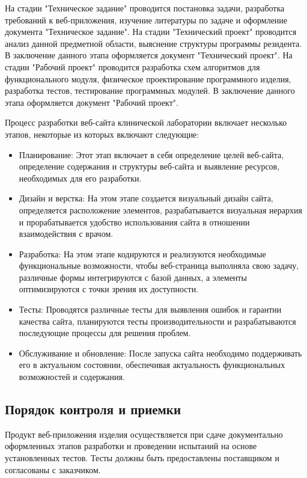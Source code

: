 На стадии "Техническое задание" проводится постановка задачи, разработка требований к веб-приложения, изучение литературы по задаче и оформление документа "Техническое задание".
На стадии "Технический проект" проводится анализ данной предметной области, выяснение структуры программы резидента. В заключение данного этапа оформляется документ "Технический проект".
На стадии "Рабочий проект" проводится разработка схем алгоритмов для функционального модуля, физическое проектирование программного изделия, разработка тестов, тестирование программных модулей. В заключение данного этапа оформляется документ "Рабочий проект".

Процесс разработки веб-сайта клинической лаборатории включает несколько этапов, некоторые из которых включают следующие:

\begin{itemize}
	\item Планирование: Этот этап включает в себя определение целей веб-сайта, определение содержания и структуры веб-сайта и выявление ресурсов, необходимых для его разработки.
	\item Дизайн и верстка: На этом этапе создается визуальный дизайн сайта, определяется расположение элементов, разрабатывается визуальная иерархия и прорабатывается удобство использования сайта в отношении взаимодействия с врачом.
	\item Разработка: На этом этапе кодируются и реализуются необходимые функциональные возможности, чтобы веб-страница выполняла свою задачу, различные формы интегрируются с базой данных, а элементы оптимизируются с точки зрения их доступности.
	\item Тесты: Проводятся различные тесты для выявления ошибок и гарантии качества сайта, планируются тесты производительности и разрабатываются последующие процессы для решения проблем.
	\item Обслуживание и обновление: После запуска сайта необходимо поддерживать его в актуальном состоянии, обеспечивая актуальность функциональных возможностей и содержания.
\end{itemize}

\subsection{Порядок контроля и приемки}

Продукт веб-приложения изделия осуществляется при сдаче документально оформленных этапов разработки и проведении испытаний на основе установленных тестов. Тесты должны быть предоставлены поставщиком и согласованы с заказчиком.

